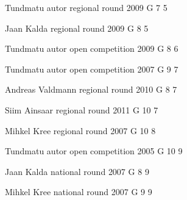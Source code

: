 \documentclass[11pt]{article}
\begin{document}
\ylDisplay{} %
{Tundmatu autor} %
{regional round} %
{2009} %
{G 7} %
{5} %
{

\ifEngStatement
\fi
}

\ylDisplay{} %
{Jaan Kalda} %
{regional round} %
{2009} %
{G 8} %
{5} %
{

\ifEngStatement
\fi
}

\ylDisplay{} %
{Tundmatu autor} %
{open competition} %
{2009} %
{G 8} %
{6} %
{

\ifEngStatement
\fi
}

\ylDisplay{} %
{Tundmatu autor} %
{open competition} %
{2007} %
{G 9} %
{7} %
{

\ifEngStatement
\fi
}

\ylDisplay{} %
{Andreas Valdmann} %
{regional round} %
{2010} %
{G 8} %
{7} %
{

\ifEngStatement
\fi
}

\ylDisplay{} %
{Siim Ainsaar} %
{regional round} %
{2011} %
{G 10} %
{7} %
{

\ifEngStatement
\fi
}

\ylDisplay{} %
{Mihkel Kree} %
{regional round} %
{2007} %
{G 10} %
{8} %
{

\ifEngStatement
\fi
}

\ylDisplay{} %
{Tundmatu autor} %
{open competition} %
{2005} %
{G 10} %
{9} %
{

\ifEngStatement
\fi
}

\ylDisplay{} %
{Jaan Kalda} %
{national round} %
{2007} %
{G 8} %
{9} %
{

\ifEngStatement
\fi
}

\ylDisplay{} %
{Mihkel Kree} %
{national round} %
{2007} %
{G 9} %
{9} %
{

\ifEngStatement
\fi
}
\end{document}
